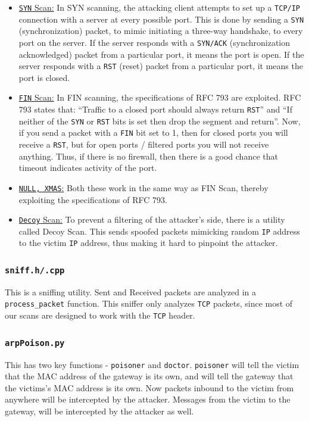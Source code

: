 \documentclass[12pt]{article}
\newcommand{\pbreak}{\vspace{4mm}}
\begin{document}
\begin{itemize}
    \item \underline{\texttt{SYN} Scan:} In SYN scanning, the attacking client attempts to set up a \texttt{TCP/IP} connection with a server at every possible port. This is done by sending a \texttt{SYN} (synchronization) packet, to mimic initiating a three-way handshake, to every port on the server. If the server responds with a \texttt{SYN/ACK} (synchronization acknowledged) packet from a particular port, it means the port is open. If the server responds with a \texttt{RST} (reset) packet from a particular port, it means the port is closed.
    
    \item \underline{\texttt{FIN} Scan:} In FIN scanning, the specifications of RFC 793 are exploited. RFC 793 states that: ``Traffic to a closed port should always return \texttt{RST}'' and ``If neither of the \texttt{SYN} or \texttt{RST} bits is set then drop the segment and return''. Now, if you send a packet with a \texttt{FIN} bit set to 1, then for closed ports you will receive a \texttt{RST}, but for open ports / filtered ports you will not receive anything. Thus, if there is no firewall, then there is a good chance that timeout indicates activity of the port.
    
    \item \underline{\texttt{NULL, XMAS}:} Both these work in the same way as FIN Scan, thereby exploiting the specifications of RFC 793.
    
    \item \underline{\texttt{Decoy} Scan:} To prevent a filtering of the attacker's side, there is a utility called Decoy Scan. This sends spoofed packets mimicking random \texttt{IP} address to the victim \texttt{IP} address, thus making it hard to pinpoint the attacker.
\end{itemize}

\subsubsection{\texttt{sniff.h/.cpp}}
This is a sniffing utility. Sent and Received packets are analyzed in a \texttt{process\_packet} function. This sniffer only analyzes \texttt{TCP} packets, since most of our scans are designed to work with the \texttt{TCP} header.

\subsubsection{\texttt{arpPoison.py}}
This has two key functions - \texttt{poisoner} and \texttt{doctor}. \texttt{poisoner} will tell the victim that the MAC address of the gateway is its own, and will tell the gateway that the victims's MAC address is its own. Now packets inbound to the victim from anywhere will be intercepted by the attacker.
Messages from the victim to the gateway, will be intercepted by the attacker as well.
\pbreak
\end{document}

